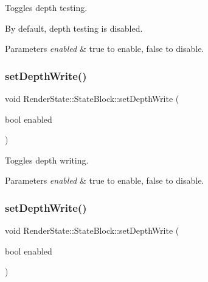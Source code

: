 Toggles depth testing.

By default, depth testing is disabled.


\begin{DoxyParams}{Parameters}
{\em enabled} & true to enable, false to disable. \\
\hline
\end{DoxyParams}
\mbox{\label{classRenderState_1_1StateBlock_a49ef11a9c1f4d967e184fbfa3c39f4bc}} 
\subsubsection{\texorpdfstring{set\+Depth\+Write()}{setDepthWrite()}\hspace{0.1cm}{\footnotesize\ttfamily [1/2]}}
{\footnotesize\ttfamily void Render\+State\+::\+State\+Block\+::set\+Depth\+Write (\begin{DoxyParamCaption}\item[{bool}]{enabled }\end{DoxyParamCaption})}

Toggles depth writing.


\begin{DoxyParams}{Parameters}
{\em enabled} & true to enable, false to disable. \\
\hline
\end{DoxyParams}
\mbox{\label{classRenderState_1_1StateBlock_a49ef11a9c1f4d967e184fbfa3c39f4bc}} 
\subsubsection{\texorpdfstring{set\+Depth\+Write()}{setDepthWrite()}\hspace{0.1cm}{\footnotesize\ttfamily [2/2]}}
{\footnotesize\ttfamily void Render\+State\+::\+State\+Block\+::set\+Depth\+Write (\begin{DoxyParamCaption}\item[{bool}]{enabled }\end{DoxyParamCaption})}

